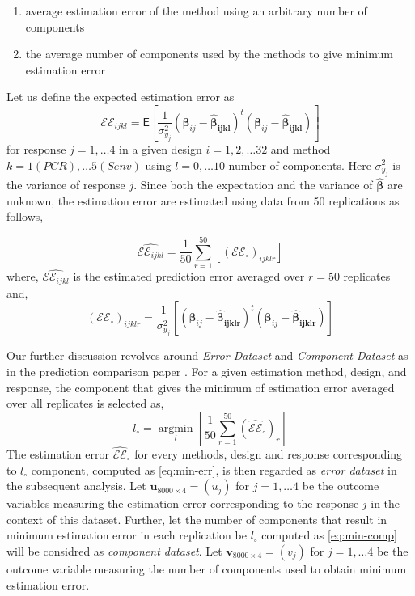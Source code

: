 \documentclass[12pt,3p,authoryear]{elsarticle}
\providecommand{\tightlist}{%
  \setlength{\itemsep}{0pt}\setlength{\parskip}{0pt}}
\begin{document}
\begin{enumerate}
\def\labelenumi{\alph{enumi})}
\tightlist
\item
  average estimation error of the method using an arbitrary number of components
\item
  the average number of components used by the methods to give minimum estimation error
\end{enumerate}

Let us define the expected estimation error as
\begin{equation}
\mathcal{EE}_{ijkl} =
  \mathsf{E}{\left[\frac{1}{\sigma_{y_j}^2}\left(\boldsymbol{\beta}_{ij} -
  \boldsymbol{\hat{\beta}_{ijkl}}\right)^t
  \left(\boldsymbol{\beta}_{ij} - \boldsymbol{\hat{\beta}_{ijkl}}\right)\right]}
\label{eq:est-error}
\end{equation}
for response \(j = 1, \ldots 4\) in a given design \(i=1, 2, \ldots 32\) and method \(k=1(PCR), \ldots 5(Senv)\) using \(l=0, \ldots 10\) number of components. Here \(\sigma_{y_j}^2\) is the variance of response \(j\). Since both the expectation and the variance of \(\hat{\boldsymbol{\beta}}\) are unknown, the estimation error are estimated using data from 50 replications as follows,

\begin{equation}
\widehat{\mathcal{EE}_{ijkl}} =
  \frac{1}{50}\sum_{r=1}^{50}{\left[
  \left(\mathcal{EE}_\circ\right)_{ijklr}
  \right]}
\label{eq:estimated-est-error}
\end{equation}
where, \(\widehat{\mathcal{EE}_{ijkl}}\) is the estimated prediction error averaged over \(r=50\) replicates and,
\[\left(\mathcal{EE}_\circ\right)_{ijklr} = \frac{1}{\sigma_{y_j}^2}\left[
  \left(\boldsymbol{\beta}_{ij}
    -\boldsymbol{\hat{\beta}_{ijklr}}\right)^t\left(\boldsymbol{\beta}_{ij} -
    \boldsymbol{\hat{\beta}_{ijklr}}\right)
  \right]\]

Our further discussion revolves around \emph{Error Dataset} and \emph{Component Dataset} as in the prediction comparison paper \citet{rimal2019pred}. For a given estimation method, design, and response, the component that gives the minimum of estimation error averaged over all replicates is selected as,
\begin{equation}
  l_\circ = \operatorname*{argmin}_{l}\left[\frac{1}{50}\sum_{r=1}^{50}{\left(\widehat{\mathcal{EE}}_\circ\right)_{r}}\right]
  \label{eq:min-err}
\end{equation}
The estimation error \(\widehat{\mathcal{EE}}_\circ\) for every methods, design
and response corresponding to \(l_\circ\) component, computed as
\eqref{eq:min-err}, is then regarded as \emph{error dataset} in the subsequent
analysis. Let \(\mathbf{u}_{8000\times4}=(u_j)\) for \(j = 1, \ldots 4\) be the
outcome variables measuring the estimation error corresponding to the response
\(j\) in the context of this dataset. Further, let the number of components that
result in minimum estimation error in each replication be \(l_\circ\) computed as
\eqref{eq:min-comp} will be considred as \emph{component dataset}. Let
\(\mathbf{v}_{8000\times4}=(v_j)\) for \(j = 1, \ldots 4\) be the outcome variable measuring the number of components used to obtain minimum estimation error.
\end{document}
